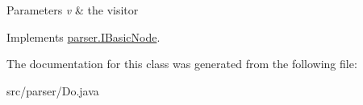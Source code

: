 \begin{DoxyParams}{Parameters}
{\em v} & the visitor \\
\hline
\end{DoxyParams}


Implements \hyperlink{interfaceparser_1_1_i_basic_node_af8790b7076c59e00781ba3d4118757cd}{parser.\+I\+Basic\+Node}.



The documentation for this class was generated from the following file\+:\begin{DoxyCompactItemize}
\item 
src/parser/Do.\+java\end{DoxyCompactItemize}
